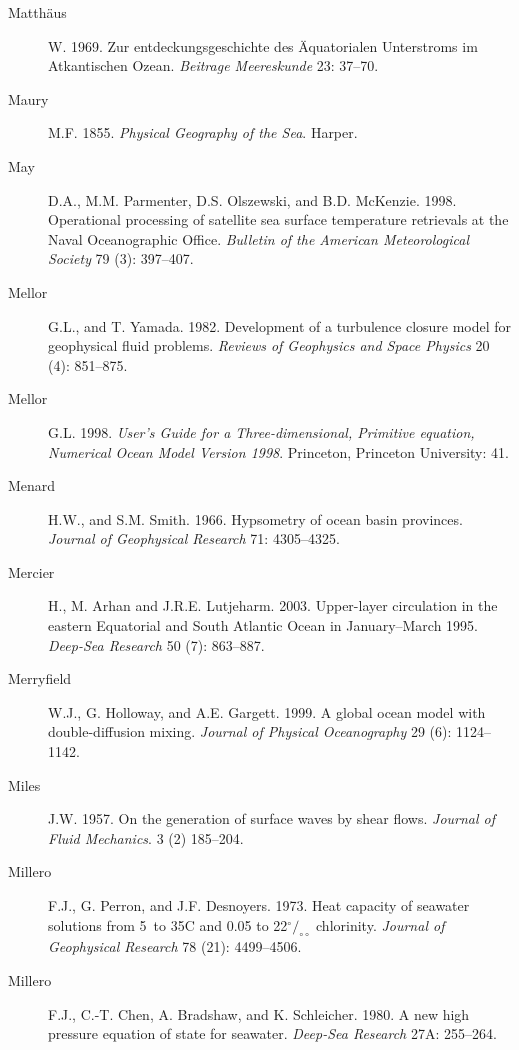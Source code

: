\begin{description}
\item[Matth\"{a}us]W. 1969. Zur entdeckungsgeschichte des \"{A}quatorialen
Unterstroms im Atkantischen Ozean. \textit{Beitrage Meereskunde} 23: 37--70.

\item [Maury]M.F. 1855. \textit{Physical Geography of the Sea}.  Harper.

\item[May]D.A., M.M. Parmenter, D.S. Olszewski, and B.D. McKenzie. 1998.
Operational processing of satellite sea surface temperature retrievals at the
Naval Oceanographic Office. \textit{Bulletin of the American Meteorological
Society} 79 (3): 397--407.

\item [Mellor]G.L., and
T. Yamada. 1982. Development of a turbulence closure model for geophysical fluid
problems. \textit{Reviews of Geophysics and Space Physics} 20 (4): 851--875.

\item [Mellor]G.L. 1998. \textit{User's Guide for a Three-dimensional, Primitive equation, Numerical Ocean Model Version 1998}. Princeton, Princeton University: 41.
	
\item [Menard]H.W., and S.M. Smith. 1966. Hypsometry of ocean basin provinces.
\textit{Journal of Geophysical Research} 71: 4305--4325.

\item [Mercier]H., M. Arhan and J.R.E. Lutjeharm. 2003. Upper-layer
circulation in the eastern Equatorial and South Atlantic Ocean in January--March
1995. \textit{Deep-Sea Research} 50 (7): 863--887.

\item [Merryfield]W.J., G. Holloway, and A.E. Gargett.
1999. A global ocean model with double-diffusion mixing. \textit{Journal of
Physical Oceanography} 29 (6): 1124--1142.

\item [Miles]J.W. 1957. On the generation of surface waves by shear flows.
\textit{Journal of Fluid Mechanics}. 3 (2) 185--204.

\item [Millero]F.J., G. Perron, and J.F. Desnoyers. 1973. Heat capacity of
seawater solutions from 5\degrees\  to 35\degrees C and 0.05 to
22$^\circ/_{\circ\circ}$  chlorinity. \textit{Journal of Geophysical Research} 78
(21): 4499--4506.

\item[Millero]F.J., C.-T. Chen, A. Bradshaw, and K. Schleicher. 1980. A new
high pressure equation of state for seawater. \textit{Deep-Sea Research} 27A:
255--264.


\end{description}
